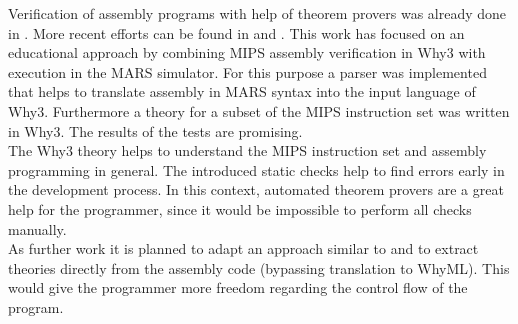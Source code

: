 Verification of assembly programs with help of theorem provers was already done in \cite{spade}. More recent
efforts can be found in \cite{verimix} and \cite{why3-avr}.
This work has focused on an educational approach by combining MIPS assembly verification in Why3 with execution
in the MARS simulator. For this purpose a parser was implemented that helps to translate assembly in MARS syntax into 
the input language of Why3. Furthermore a theory for a subset of the MIPS instruction set was written in Why3.
The results of the tests are promising. \\
The Why3 theory helps to understand the MIPS instruction set and assembly
programming in general. The introduced static checks help to find errors early in the development process.
In this context, automated theorem provers are a great help for the programmer, since it would be impossible to perform all checks manually.\\
 As further work it is planned to adapt an approach similar to \cite{verimix} and to extract theories directly 
from the assembly code (bypassing translation to WhyML). This would give the programmer more freedom regarding the
control flow of the program.  